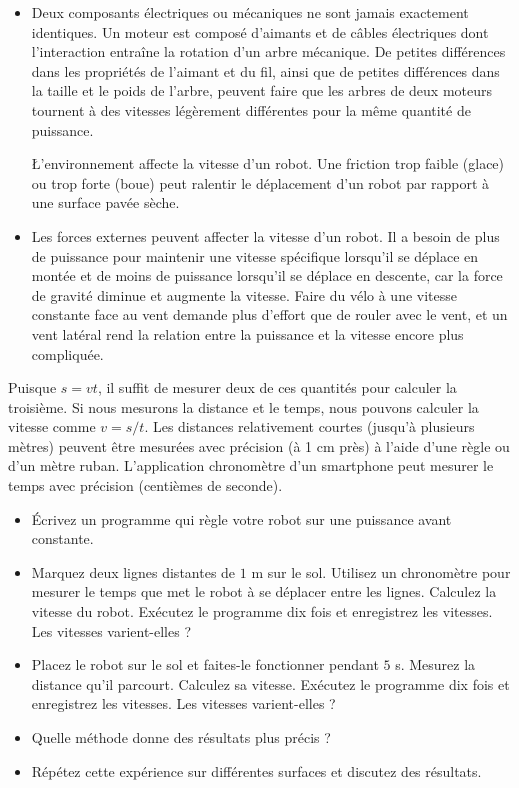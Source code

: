 {\begin{itemize}
\item Deux composants électriques ou mécaniques ne sont jamais exactement identiques. Un moteur est composé d'aimants et de câbles électriques dont l'interaction entraîne la rotation d'un arbre mécanique. De petites différences dans les propriétés de l'aimant et du fil, ainsi que de petites différences dans la taille et le poids de l'arbre, peuvent faire que les arbres de deux moteurs tournent à des vitesses légèrement différentes pour la même quantité de puissance.

\L'environnement affecte la vitesse d'un robot. Une friction trop faible (glace) ou trop forte (boue) peut ralentir le déplacement d'un robot par rapport à une surface pavée sèche.

\item Les forces externes peuvent affecter la vitesse d'un robot. Il a besoin de plus de puissance pour maintenir une vitesse spécifique lorsqu'il se déplace en montée et de moins de puissance lorsqu'il se déplace en descente, car la force de gravité diminue et augmente la vitesse. Faire du vélo à une vitesse constante face au vent demande plus d'effort que de rouler avec le vent, et un vent latéral rend la relation entre la puissance et la vitesse encore plus compliquée.
\end{itemize}

Puisque $s=vt$, il suffit de mesurer deux de ces quantités pour calculer la troisième. Si nous mesurons la distance et le temps, nous pouvons calculer la vitesse comme $v=s/t$. Les distances relativement courtes (jusqu'à plusieurs mètres) peuvent être mesurées avec précision (à 1 cm près) à l'aide d'une règle ou d'un mètre ruban. L'application chronomètre d'un smartphone peut mesurer le temps avec précision (centièmes de seconde).

\begin{framed}
\begin{itemize}
\item Écrivez un programme qui règle votre robot sur une puissance avant constante.
\item Marquez deux lignes distantes de $1$ m sur le sol. Utilisez un chronomètre pour mesurer le temps que met le robot à se déplacer entre les lignes. Calculez la vitesse du robot. Exécutez le programme dix fois et enregistrez les vitesses. Les vitesses varient-elles ?
\item Placez le robot sur le sol et faites-le fonctionner pendant $5$ s. Mesurez la distance qu'il parcourt. Calculez sa vitesse. Exécutez le programme dix fois et enregistrez les vitesses. Les vitesses varient-elles ?
\item Quelle méthode donne des résultats plus précis ?
\item Répétez cette expérience sur différentes surfaces et discutez des résultats.
\end{itemize}
\end{framed}

}
